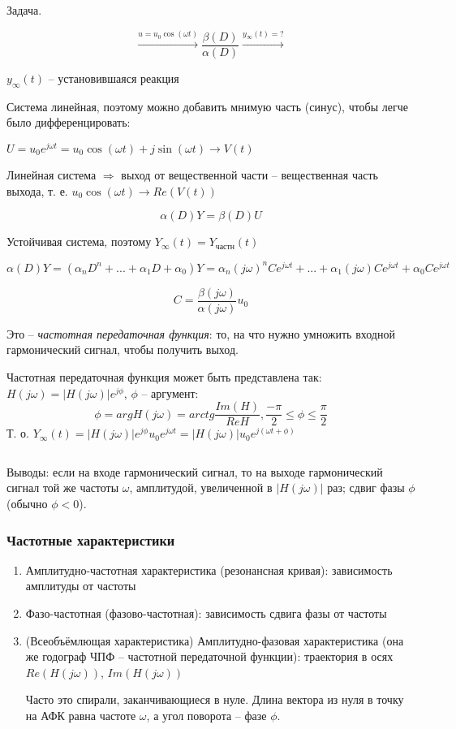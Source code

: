 \documentclass[main.tex]{subfiles}
\begin{document}
Задача.

$$ \xrightarrow{u = u_0 \cos (\omega t)} \boxed{\frac{\beta (D)}{\alpha (D)}} \xrightarrow{y_\infty(t) = ?} $$

$y_\infty(t)$ -- установившаяся реакция

Система линейная, поэтому можно добавить мнимую часть (синус), чтобы легче было дифференцировать:

$ U = u_0 e^{j \omega t} = u_0 \cos (\omega t) + j \sin (\omega t) \to V(t) $

Линейная система $ \Rightarrow $ выход от вещественной части -- вещественная часть выхода, т. е. $ u_0 \cos (\omega t) \to Re(V(t)) $

$$ \alpha(D) Y = \beta(D) U $$

Устойчивая система, поэтому $ Y_\infty(t) = Y_{\text{частн}}(t) $

$$ \alpha(D)Y = (\alpha_n D^n + ... + \alpha_1 D + \alpha_0) Y = \alpha_n (j \omega)^n Ce^{j \omega t} + ... + \alpha_1 (j\omega) C e^{j \omega t} + \alpha_0 Ce^{j \omega t} $$


$$ C = \frac{\beta(j\omega)}{\alpha(j\omega)} u_0 $$

Это -- \emph{частотная передаточная функция}: то, на что нужно умножить входной гармонический сигнал, чтобы получить выход.

Частотная передаточная функция может быть представлена так: $ H(j\omega) = |H(j\omega)| e^{j \phi} $, $\phi$ -- аргумент:
$$ \phi = arg H(j \omega) = arctg \frac{Im(H)}{Re H}, \frac{-\pi}{2} \le \phi \le \frac{\pi}{2} $$
Т. о. $ \boxed{ Y_\infty(t) = |H(j\omega)| e^{j \phi} u_0 e^{j \omega t} = |H(j\omega)|u_0 e^{j(\omega t + \phi)} }  $

$$  $$ %

Выводы: если на входе гармонический сигнал, то на выходе гармонический сигнал той же частоты $ \omega $, амплитудой, увеличенной в $ |H(j \omega)| $ раз; сдвиг фазы $\phi$ (обычно $ \phi < 0 $).

\subsubsection{Частотные характеристики}

\begin{enumerate}[noitemsep]
    \item Амплитудно-частотная характеристика (резонансная кривая): зависимость амплитуды от частоты %
    \item Фазо-частотная (фазово-частотная): зависимость сдвига фазы от частоты %
    \item (Всеобъёмлющая характеристика) Амплитудно-фазовая характеристика (она же годограф ЧПФ -- частотной передаточной функции): траектория в осях $ Re (H(j\omega)) $, $ Im(H(j\omega)) $ %
    
    Часто это спирали, заканчивающиеся в нуле.
    Длина вектора из нуля в точку на АФК равна частоте $ \omega $, а угол поворота -- фазе $ \phi $. 
\end{enumerate}
\end{document}
